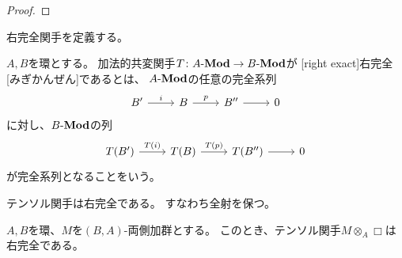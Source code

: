 \documentclass[report]{jlreq}
\begin{document}
\begin{proof}
    \TODO{}
\end{proof}

右完全関手を定義する。

\begin{definition}[右完全関手]
    $A, B$を環とする。
    加法的共変関手$T \colon A\text{-}\mathbf{Mod} \to B\text{-}\mathbf{Mod}$が
    [right exact]{右完全}[みぎかんぜん]であるとは、
    $A\text{-}\mathbf{Mod}$の任意の完全系列
    \begin{equation}
        \begin{tikzcd}
            B' \ar{r}{i} & B \ar{r}{p} & B'' \ar{r} & 0
        \end{tikzcd}
    \end{equation}
    に対し、$B\text{-}\mathbf{Mod}$の列
    \begin{equation}
        \begin{tikzcd}
            T(B') \ar{r}{T(i)} & T(B) \ar{r}{T(p)} & T(B'') \ar{r} & 0
        \end{tikzcd}
    \end{equation}
    が完全系列となることをいう。
\end{definition}

テンソル関手は右完全である。
すなわち全射を保つ。

\begin{theorem}[テンソル関手の右完全性]
    $A, B$を環、$M$を$(B, A)$-両側加群とする。
    このとき、テンソル関手$M \otimes_A \Box$は右完全である。
\end{theorem}
\end{document}
